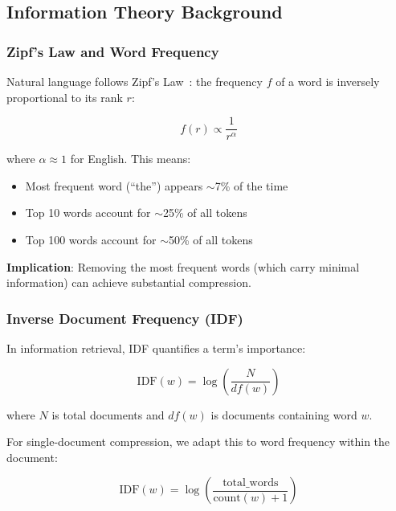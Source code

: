 \label{sec:theory}

\subsection{Information Theory Background}

\subsubsection{Zipf's Law and Word Frequency}

Natural language follows Zipf's Law~\cite{zipf1935psycho}: the frequency $f$ of a word is inversely proportional to its rank $r$:

\begin{equation}
f(r) \propto \frac{1}{r^\alpha}
\end{equation}

where $\alpha \approx 1$ for English. This means:
\begin{itemize}
    \item Most frequent word (``the'') appears $\sim$7\% of the time
    \item Top 10 words account for $\sim$25\% of all tokens
    \item Top 100 words account for $\sim$50\% of all tokens
\end{itemize}

\textbf{Implication}: Removing the most frequent words (which carry minimal information) can achieve substantial compression.

\subsubsection{Inverse Document Frequency (IDF)}

In information retrieval, IDF quantifies a term's importance:

\begin{equation}
\text{IDF}(w) = \log\left(\frac{N}{df(w)}\right)
\end{equation}

where $N$ is total documents and $df(w)$ is documents containing word $w$.

For single-document compression, we adapt this to word frequency within the document:

\begin{equation}
\text{IDF}(w) = \log\left(\frac{\text{total\_words}}{\text{count}(w) + 1}\right)
\end{equation}

